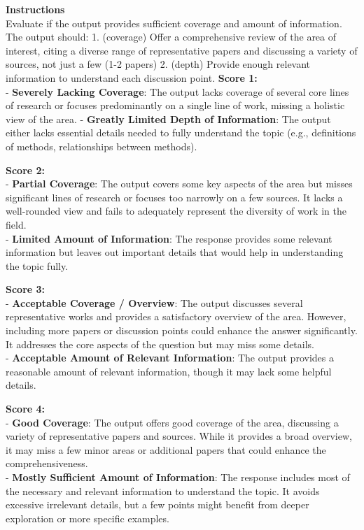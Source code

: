 \begin{table}[h!]
\begin{tcolorbox}[colback=blue!5!white,colframe=blue!75!black]
{\bf Instructions}\\ 
Evaluate if the output provides sufficient coverage and amount of information. The output should: 1. (coverage) Offer a comprehensive review of the area of interest, citing a diverse range of representative papers and discussing a variety of sources, not just a few (1-2 papers) 2. (depth) Provide enough relevant information to understand each discussion point.  
\tcblower
{\bf Score 1: }\\
- {\bf Severely Lacking Coverage}: The output lacks coverage of several core lines of research or focuses predominantly on a single line of work, missing a holistic view of the area.
- {\bf Greatly Limited Depth of Information}: The output either lacks essential details needed to fully understand the topic (e.g., definitions of methods, relationships between methods). 

{\bf Score 2:}\\
- {\bf Partial Coverage}: The output covers some key aspects of the area but misses significant lines of research or focuses too narrowly on a few sources. It lacks a well-rounded view and fails to adequately represent the diversity of work in the field.\\
- {\bf Limited Amount of Information}: The response provides some relevant information but leaves out important details that would help in understanding the topic fully.

{\bf Score 3: }\\
- {\bf Acceptable Coverage / Overview}: The output discusses several representative works and provides a satisfactory overview of the area. However, including more papers or discussion points could enhance the answer significantly. It addresses the core aspects of the question but may miss some details.\\
- {\bf Acceptable Amount of Relevant Information}: The output provides a reasonable amount of relevant information, though it may lack some helpful details. 

{\bf Score 4: }\\
- {\bf Good Coverage}: The output offers good coverage of the area, discussing a variety of representative papers and sources. While it provides a broad overview, it may miss a few minor areas or additional papers that could enhance the comprehensiveness.\\
- {\bf Mostly Sufficient Amount of Information}: The response includes most of the necessary and relevant information to understand the topic. It avoids excessive irrelevant details, but a few points might benefit from deeper exploration or more specific examples.


\end{tcolorbox}
\end{table}
